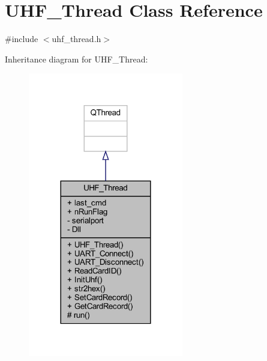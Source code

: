 \hypertarget{class_u_h_f___thread}{}\section{U\+H\+F\+\_\+\+Thread Class Reference}
\label{class_u_h_f___thread}


{\ttfamily \#include $<$uhf\+\_\+thread.\+h$>$}



Inheritance diagram for U\+H\+F\+\_\+\+Thread\+:
\nopagebreak
\begin{figure}[H]
\begin{center}
\leavevmode
\includegraphics[width=192pt]{class_u_h_f___thread__inherit__graph}
\end{center}
\end{figure}


